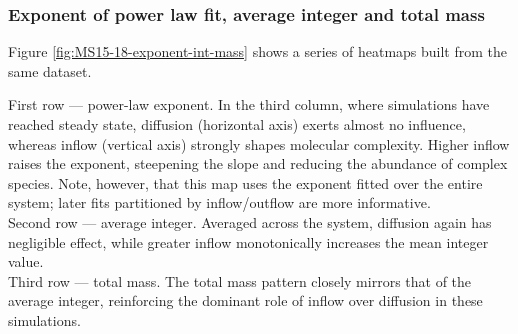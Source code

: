 \documentclass[11pt]{article}
\begin{document}
\clearpage

\subsubsection{Exponent of power law fit, average integer and total mass}

Figure \ref{fig:MS15-18-exponent-int-mass} shows a series of heatmaps built from the same dataset.\

First row — power-law exponent.  In the third column, where simulations have reached steady state, diffusion (horizontal axis) exerts almost no influence, whereas inflow (vertical axis) strongly shapes molecular complexity. Higher inflow raises the exponent, steepening the slope and reducing the abundance of complex species. Note, however, that this map uses the exponent fitted over the entire system; later fits partitioned by inflow/outflow are more informative.\\

Second row — average integer.  Averaged across the system, diffusion again has negligible effect, while greater inflow monotonically increases the mean integer value.\\

Third row — total mass.  The total mass pattern closely mirrors that of the average integer, reinforcing the dominant role of inflow over diffusion in these simulations.\\

\clearpage
\end{document}
